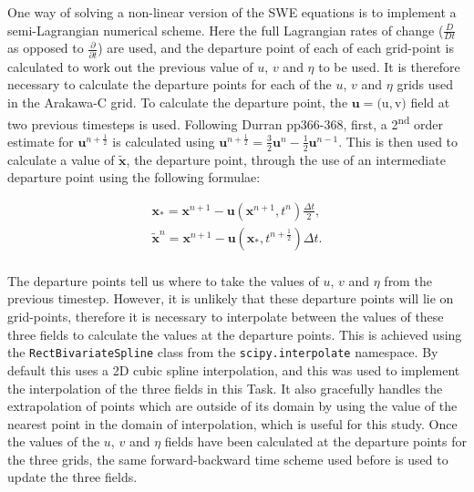 \documentclass{article}
\newcommand{\ts}{\textsuperscript}
\begin{document}
One way of solving a non-linear version of the SWE equations is to implement a semi-Lagrangian
numerical scheme. Here the full Lagrangian rates of change ($\frac{D}{Dt}$ as opposed to
$\frac{\partial}{\partial t}$) are used, and the departure point of each of each grid-point is
calculated to work out the previous value of $u$, $v$ and $\eta$ to be used. It is therefore
necessary to calculate the departure points for each of the $u$, $v$ and $\eta$ grids used in the
Arakawa-C grid.  To calculate the departure point, the $\boldsymbol{u} =  ($u$, $v$)$ field at two
previous timesteps is used. Following Durran pp366-368, first, a 2\ts{nd} order estimate for
$\boldsymbol{u}^{n + \frac{1}{2}}$ is calculated using $\boldsymbol{u}^{n + \frac{1}{2}} =
\frac{3}{2}  \boldsymbol{u}^{n} - \frac{1}{2} \boldsymbol{u}^{n-1}$. This is then used to calculate
a value of $\tilde{\boldsymbol{x}}$, the departure point, through the use of an intermediate
departure point using the following formulae:

\begin{align}
    \label{eqn:sl_update1} 
    \boldsymbol{x_{*}} = \boldsymbol{x}^{n+1} - \boldsymbol{u}(\boldsymbol{x}^{n+1}, t^n)
    \frac{\Delta t}{2},\\
    \label{eqn:sl_update2} 
    \boldsymbol{\tilde{x}}^n = \boldsymbol{x}^{n+1} - \boldsymbol{u}(\boldsymbol{x_{*}},
    t^{n+\frac{1}{2}}) \Delta t.\\
\end{align}

The departure points tell us where to take the values of $u$, $v$ and $\eta$ from the previous
timestep. However, it is unlikely that these departure points will lie on grid-points, therefore it
is necessary to interpolate between the values of these three fields to calculate the values at the
departure points. This is achieved using the \lstinline[basicstyle=\ttfamily]|RectBivariateSpline|
class from the \lstinline[basicstyle=\ttfamily]|scipy.interpolate| namespace. By default this uses a
2D cubic spline interpolation, and this was used to implement the interpolation of the three fields
in this Task. It also gracefully handles the extrapolation of points which are outside of its domain
by using the value of the nearest point in the domain of interpolation, which is useful for this
study. Once the values of the $u$, $v$ and $\eta$ fields have been calculated at the departure points
for the three grids, the same forward-backward time scheme used before is used to update the three
fields. 
\end{document}
